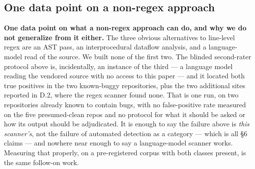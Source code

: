 \documentclass[10pt]{article} %
\begin{document}
\subsection{One data point on a non-regex approach}

\textbf{One data point on what a non-regex approach can do, and why we do not
generalize from it either.} The three obvious alternatives to line-level regex
are an AST pass, an interprocedural dataflow analysis, and a language-model
read of the source. We built none of the first two. The blinded second-rater
protocol above is, incidentally, an instance of the third --- a language model
reading the vendored source with no access to this paper --- and it located
both true positives in the two known-buggy repositories, plus the two additional sites reported in D.2, where the regex scanner found none. That is
one run, on two repositories already known to contain bugs, with no
false-positive rate measured on the five presumed-clean repos and no protocol
for what it should be asked or how its output should be adjudicated. It is
enough to say the failure above is \emph{this scanner's}, not the failure of
automated detection as a category --- which is all §6 claims --- and nowhere
near enough to say a language-model scanner works. Measuring that properly, on
a pre-registered corpus with both classes present, is the same follow-on work.
\end{document}
